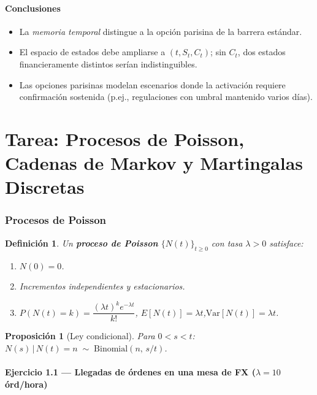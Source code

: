 \documentclass[12pt,letterpaper]{article}
\newtheorem{proposition}[theorem]{Proposici\'on}
\newtheorem{definition}{Definici\'on}[section]
\begin{document}
\subsection{Conclusiones}

\begin{itemize}
  \item La \emph{memoria temporal} distingue a la opci\'on parisina de la barrera
    est\'andar.
  \item El espacio de estados debe ampliarse a $(t, S_t, C_t)$; sin $C_t$, dos
    estados financieramente distintos ser\'ian indistinguibles.
  \item Las opciones parisinas modelan escenarios donde la activaci\'on requiere
    confirmaci\'on sostenida (p.ej., regulaciones con umbral mantenido varios d\'ias).
\end{itemize}

\part{Tarea: Procesos de Poisson, Cadenas de Markov y Martingalas Discretas}

\section{Procesos de Poisson}

\begin{definition}
Un \textbf{proceso de Poisson} $\{N(t)\}_{t \geq 0}$ con tasa $\lambda > 0$
satisface:
\begin{enumerate}
  \item $N(0) = 0$.
  \item Incrementos independientes y estacionarios.
  \item $P(N(t) = k) = \dfrac{(\lambda t)^k e^{-\lambda t}}{k!}$,\quad
    $E[N(t)] = \lambda t$,\quad $\mathrm{Var}[N(t)] = \lambda t$.
\end{enumerate}
\end{definition}

\begin{proposition}[Ley condicional]
  Para $0 < s < t$:\quad $N(s)\,|\,N(t)=n \;\sim\; \mathrm{Binomial}(n,\, s/t)$.
\end{proposition}

\subsection*{Ejercicio 1.1 --- Llegadas de \'ordenes en una mesa de FX
  ($\lambda = 10$ \'ord/hora)}
\end{document}
